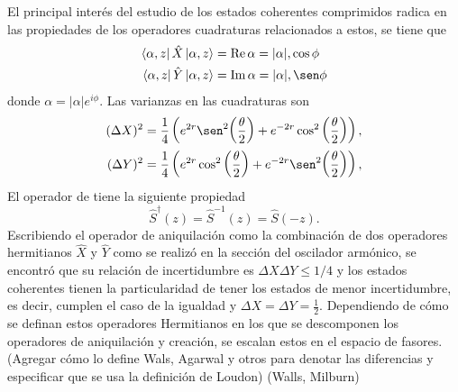 El principal interés del estudio de los estados coherentes comprimidos radica en las propiedades de los operadores cuadraturas relacionados a estos, se tiene que
\begin{align}
  \bra{\alpha, z}\hat{X}\ket{\alpha, z}   & = \Re \alpha = |\alpha|, \cos\phi \\
  \bra{\alpha, z} \hat{Y} \ket{\alpha, z} & = \Im \alpha = |\alpha| ,\sen\phi
\end{align}
donde $\alpha = |\alpha|e^{i\phi}$. Las varianzas en las cuadraturas son
\begin{align}
  (\Delta X)^2 & = \frac{1}{4}\left( e^{2r}\sen^2{\left( \frac{\theta}{2} \right)} +e^{-2r}\cos^2{\left( \frac{\theta}{2} \right)} \right), \\
  (\Delta Y)^2 & = \frac{1}{4}\left( e^{2r}\cos^2{\left( \frac{\theta}{2} \right)} +e^{-2r}\sen^2{\left( \frac{\theta}{2} \right)} \right),
\end{align}
El operador de tiene la siguiente propiedad
\begin{equation}
  \hat{S}^{\dagger}(z) = \hat{S}^{-1}(z) = \hat{S}(-z).
\end{equation}
Escribiendo el operador de aniquilación como la combinación de dos operadores hermitianos $\hat{X}$ y $\hat{Y}$ como se realizó en la sección del oscilador armónico, se encontró que su relación de incertidumbre es $\Delta X \Delta Y \leq 1/4$ y los estados coherentes tienen la particularidad de tener los estados de menor incertidumbre, es decir, cumplen el caso de la igualdad y $\Delta X = \Delta Y = \frac{1}{2}$. Dependiendo de cómo se definan estos operadores Hermitianos en los que se descomponen los operadores de aniquilación y creación, se escalan estos en el espacio de fasores. (Agregar cómo lo define Wals, Agarwal y otros para denotar las diferencias y especificar que se usa la definición de Loudon)
(Walls, Milburn)

